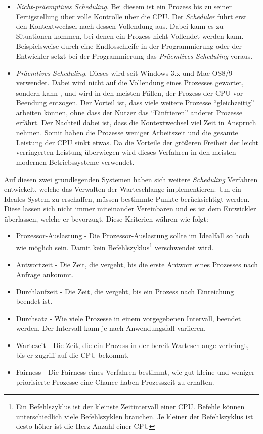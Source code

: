 \begin{itemize}
    \item \textit{Nicht-präemptives Scheduling}. Bei diesem ist ein Prozess bis zu seiner Fertigstellung über volle Kontrolle über die CPU. Der \textit{Scheduler} führt erst den Kontextwechsel nach dessen Vollendung aus. Dabei kann es zu Situationen kommen, bei denen ein Prozess nicht Vollendet werden kann. Beispielsweise durch eine Endlosschleife in der Programmierung oder der Entwickler setzt bei der Programmierung das \textit{Präemtives Scheduling} voraus.
    \item \textit{Präemtives Scheduling}. Dieses wird seit Windows 3.x und Mac OS8/9 verwendet. Dabei wird nicht auf die Vollendung eines Prozesses gewartet, sondern kann , und wird in den meisten Fällen, der Prozess der CPU vor Beendung entzogen. Der Vorteil ist, dass viele weitere Prozesse ``gleichzeitig'' arbeiten können, ohne dass der Nutzer das ``Einfrieren'' anderer Prozesse erfährt. Der Nachteil dabei ist, dass die Kontextwechsel viel Zeit in Anspruch nehmen. Somit haben die Prozesse weniger Arbeitszeit und die gesamte Leistung der CPU sinkt etwas. Da die Vorteile der größeren Freiheit der leicht verringerten Leistung überwiegen wird dieses Verfahren in den meisten modernen Betriebssysteme verwendet.
\end{itemize}

Auf diesen zwei grundlegenden Systemen haben sich weitere \textit{Scheduling} Verfahren entwickelt, welche das Verwalten der Warteschlange implementieren. Um ein Ideales System zu erschaffen, müssen bestimmte Punkte berücksichtigt werden. Diese lassen sich nicht immer miteinander Vereinbaren und es ist dem Entwickler überlassen, welche er bevorzugt. Diese Kriterien währen wie folgt:
\begin{itemize}
    \item Prozessor-Auslastung - Die Prozessor-Auslastung sollte im Idealfall so hoch wie möglich sein. Damit kein Befehlszyklus\footnote{Ein Befehlszyklus ist der kleinste Zeitintervall einer CPU. Befehle können unterschiedlich viele Befehlszyklen brauchen. Je kleiner der Befehlszyklus ist desto höher ist die Herz Anzahl einer CPU} verschwendet wird.
    \item Antwortzeit - Die Zeit, die vergeht, bis die erste Antwort eines Prozesses nach Anfrage ankommt.
    \item Durchlaufzeit - Die Zeit, die vergeht, bis ein Prozess nach Einreichung beendet ist.
    \item Durchsatz - Wie viele Prozesse in einem vorgegebenen Intervall, beendet werden. Der Intervall kann je nach Anwendungsfall variieren.
    \item Wartezeit - Die Zeit, die ein Prozess in der bereit-Warteschlange verbringt, bis er zugriff auf die CPU bekommt.
    \item Fairness - Die Fairness eines Verfahren bestimmt, wie gut kleine und weniger priorisierte Prozesse eine Chance haben Prozesszeit zu erhalten.
\end{itemize}

